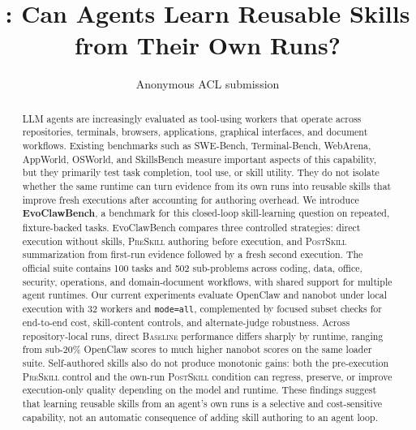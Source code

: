 \documentclass[11pt]{article}
\title{\ours{}: Can Agents Learn Reusable Skills from Their Own Runs?}
\author{
  Anonymous ACL submission
}
\newcommand{\ours}{EvoClawBench}
\newcommand{\baseline}{\textsc{Baseline}}
\newcommand{\preskill}{\textsc{PreSkill}}
\newcommand{\postskill}{\textsc{PostSkill}}
\begin{document}
\maketitle

\begin{abstract}
LLM agents are increasingly evaluated as tool-using workers that operate across repositories, terminals, browsers, applications, graphical interfaces, and document workflows.
Existing benchmarks such as SWE-Bench, Terminal-Bench, WebArena, AppWorld, OSWorld, and SkillsBench measure important aspects of this capability, but they primarily test task completion, tool use, or skill utility.
They do not isolate whether the same runtime can turn evidence from its own runs into reusable skills that improve fresh executions after accounting for authoring overhead.
We introduce \textbf{\ours{}}, a benchmark for this closed-loop skill-learning question on repeated, fixture-backed tasks.
\ours{} compares three controlled strategies: direct execution without skills, \preskill{} authoring before execution, and \postskill{} summarization from first-run evidence followed by a fresh second execution.
The official suite contains 100 tasks and 502 sub-problems across coding, data, office, security, operations, and domain-document workflows, with shared support for multiple agent runtimes.
Our current experiments evaluate OpenClaw and nanobot under local execution with 32 workers and \texttt{mode=all}, complemented by focused subset checks for end-to-end cost, skill-content controls, and alternate-judge robustness.
Across repository-local runs, direct \baseline{} performance differs sharply by runtime, ranging from sub-20\% OpenClaw scores to much higher nanobot scores on the same loader suite.
Self-authored skills also do not produce monotonic gains: both the pre-execution \preskill{} control and the own-run \postskill{} condition can regress, preserve, or improve execution-only quality depending on the model and runtime.
These findings suggest that learning reusable skills from an agent's own runs is a selective and cost-sensitive capability, not an automatic consequence of adding skill authoring to an agent loop.
\end{abstract}
\end{document}
